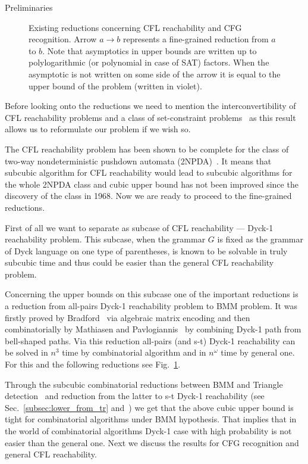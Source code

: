 \documentclass[12pt]{article}
\begin{document}
\begin{section}{Preliminaries}
\begin{figure}[!htp]
		\caption{Existing reductions concerning CFL reachability and CFG recognition. Arrow $a \rightarrow b$ represents a fine-grained reduction from $a$ to $b$. Note that asymptotics in upper bounds are written up to polylogarithmic (or polynomial in case of SAT) factors. When the asymptotic is not written on some side of the arrow it is equal to the upper bound of the problem (written in violet).}
		\label{fig:map}
		
	\end{figure}
	
	Before looking onto the reductions we need to mention the interconvertibility of CFL reachability problems and a class of set-constraint problems~\cite{10.1145/258994.259006} as this result allows us to reformulate our problem if we wish so.
	
	The CFL reachability problem has been shown to be complete for the class of two-way nondeterministic pushdown automata (2NPDA)~\cite{Rytter2005FastRO, 10.5555/788019.788876}. It means that subcubic algorithm for CFL reachability would lead to subcubic algorithms for the whole 2NPDA class and cubic upper bound has not been improved since the discovery of the class in 1968. Now we are ready to proceed to the fine-grained reductions.
	
	First of all we want to separate as subcase of CFL reachability --- Dyck-1 reachability problem. This subcase, when the grammar $G$ is fixed as the grammar of Dyck language on one type of parentheses, is known to be solvable in truly subcubic time and thus could be easier than the general CFL reachability problem.
	
	Concerning the upper bounds on this subcase one of the important reductions is a reduction from  all-pairs Dyck-1 reachability problem to BMM problem. It was firstly proved by Bradford~\cite{bradford2017efficient} via algebraic matrix encoding and then combinatorially by Mathiasen and Pavlogiannis~\cite{10.1145/3434315} by combining Dyck-1 path from bell-shaped paths. Via this reduction all-pairs (and s-t) Dyck-1 reachability can be solved in $n^3$ time by combinatorial algorithm and in $n^{\omega}$ time by general one. For this and the following reductions see Fig.~\ref{fig:map}.
	
	Through the subcubic combinatorial reductions between BMM and Triangle detection~\cite{Williams2009TriangleDV} and reduction from the latter to s-t Dyck-1 reachability (see Sec.~\ref{subsec:lower_from_tr} and~\cite{hansen2021tight}) we get that the above cubic upper bound is tight for combinatorial algorithms under BMM hypothesis. 
	That implies that in the world of combinatorial algorithms Dyck-1 case with high probability is not easier than the general one. Next we discuss the results for CFG recognition and general CFL reachability.
	

\end{section}
\end{document}
